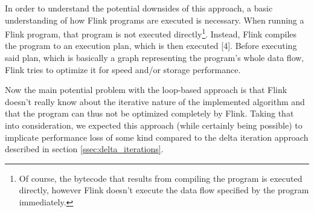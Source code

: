 
In order to understand the potential downsides of this approach, a basic
understanding of how Flink programs are executed is necessary. When running a
Flink program, that program is not executed directly\footnote{Of course, the
bytecode that results from compiling the program is executed directly, however
Flink doesn't execute the data flow specified by the program immediately.}.
Instead, Flink compiles the program to an execution plan, which is then
executed [4]. Before executing said plan, which is basically a graph
representing the program's whole data flow, Flink tries to optimize it for
speed and/or storage performance.


Now the main potential problem with the loop-based approach is that Flink
doesn't really know about the iterative nature of the implemented algorithm and
that the program can thus not be optimized completely by Flink. Taking that
into consideration, we expected this approach (while certainly being possible)
to implicate performance loss of some kind compared to the delta iteration
approach described in section \ref{ssec:delta_iterations}.

